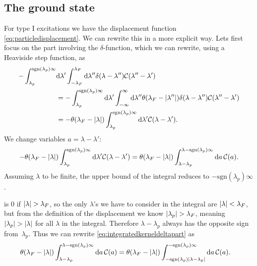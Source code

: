 \documentclass[11pt, a4paper]{report} %
\begin{document}
\subsection{The ground state}
\begin{sloppypar}
For type I excitations we have the displacement function \cref{eq:particledisplacement}.
We can rewrite this in a more explicit way.
Lets first focus on the part involving the \(\delta\)-function, which we can rewrite, using a Heaviside step function, as
\begin{align}
	- \int_{\lambda_p}^{\textrm{sgn}(\lambda_p)\infty} &\dd \lambda' \int_{-\lambda_F}^{\lambda_F} \dd  \lambda'' \delta(\lambda-\lambda'') \mathcal{C}(\lambda''-\lambda') \\
	&=- \int_{\lambda_p}^{\textrm{sgn}(\lambda_p)\infty} \dd \lambda' \int_{-\infty}^{\infty} \dd \lambda'' \theta(\lambda_F - \abs{\lambda''})  \delta(\lambda-\lambda'') \mathcal{C}(\lambda''-\lambda')\\
	&= - \theta(\lambda_F - \abs{\lambda}) \int_{\lambda_p}^{\textrm{sgn}(\lambda_p)\infty} \dd \lambda'     \mathcal{C}(\lambda-\lambda').
\end{align}
We change variables \(a=\lambda-\lambda'\):
\begin{equation}\label{eq:integratedkerneldeltapart}
	- \theta(\lambda_F - \abs{\lambda}) \int_{\lambda_p}^{\textrm{sgn}(\lambda_p)\infty} \dd \lambda'     \mathcal{C}(\lambda-\lambda')=
	 \theta(\lambda_F - \abs{\lambda}) \int_{\lambda-\lambda_p}^{\lambda - \textrm{sgn}(\lambda_p)\infty} \dd a\,\mathcal{C}(a).
\end{equation}
Assuming \(\lambda\) to be finite, the upper bound of the integral reduces to \(-\textrm{sgn}(\lambda_p)\infty\).
\end{sloppypar}

 is 0 if \(\abs{\lambda} > \lambda_F\), so the only \(\lambda\)'s we have to consider in the integral are \(\abs{\lambda}< \lambda_F\), but from the definition of the displacement we know \(\abs{\lambda_p}  >\lambda_F\), meaning \(\abs{\lambda_p} > \abs{\lambda}\) for all \(\lambda\) in the integral.
Therefore \(\lambda-\lambda_p\) always has the opposite sign from~\(\lambda_p\).
Thus we can rewrite \cref{eq:integratedkerneldeltapart} as
\begin{align}
	\theta(\lambda_F - \abs{\lambda}) \int_{\lambda-\lambda_p}^{\lambda - \textrm{sgn}(\lambda_p)\infty} \dd a\,\mathcal{C}(a) &=
	\theta(\lambda_F - \abs{\lambda}) \int_{-\textrm{sgn}(\lambda_p)\abs{\lambda-\lambda_p}}^{ - \textrm{sgn}(\lambda_p)\infty} \dd a\,\mathcal{C}(a).
\end{align}
\end{document}
